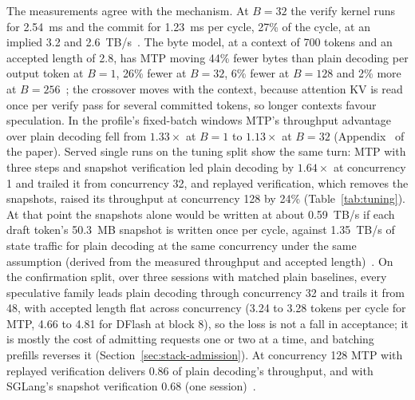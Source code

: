 The measurements agree with the mechanism. At $B=32$ the verify kernel runs for 2.54~ms and the commit for 1.23~ms per cycle, 27\% of the cycle, at an implied 3.2 and 2.6~TB/s~. The byte model, at a context of 700 tokens and an accepted length of 2.8, has MTP moving 44\% fewer bytes than plain decoding per output token at $B=1$, 26\% fewer at $B=32$, 6\% fewer at $B=128$ and 2\% more at $B=256$~; the crossover moves with the context, because attention KV is read once per verify pass for several committed tokens, so longer contexts favour speculation. In the profile's fixed-batch windows MTP's throughput advantage over plain decoding fell from $1.33\times$ at $B=1$ to $1.13\times$ at $B=32$ (Appendix~ of the paper). Served single runs on the tuning split show the same turn: MTP with three steps and snapshot verification led plain decoding by $1.64\times$ at concurrency 1 and trailed it from concurrency 32, and replayed verification, which removes the snapshots, raised its throughput at concurrency 128 by 24\% (Table~\ref{tab:tuning}). At that point the snapshots alone would be written at about 0.59~TB/s if each draft token's 50.3~MB snapshot is written once per cycle, against 1.35~TB/s of state traffic for plain decoding at the same concurrency under the same assumption (derived from the measured throughput and accepted length)~. On the confirmation split, over three sessions with matched plain baselines, every speculative family leads plain decoding through concurrency 32 and trails it from 48, with accepted length flat across concurrency (3.24 to 3.28 tokens per cycle for MTP, 4.66 to 4.81 for DFlash at block 8), so the loss is not a fall in acceptance; it is mostly the cost of admitting requests one or two at a time, and batching prefills reverses it (Section~\ref{sec:stack-admission}). At concurrency 128 MTP with replayed verification delivers 0.86 of plain decoding's throughput, and with SGLang's snapshot verification 0.68 (one session)~.

